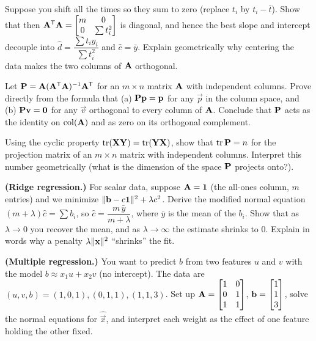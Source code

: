 \begin{exercise}\label{ch19:ex-centering}
Suppose you shift all the times so they sum to zero (replace $t_i$ by $t_i-\bar{t}$). Show that
then $\mathbf{A}^{\mathsf{T}}\mathbf{A}=\begin{bmatrix} m & 0\\ 0 & \sum t_i^2\end{bmatrix}$ is diagonal, and hence
the best slope and intercept decouple into $\hat{d}=\dfrac{\sum t_i y_i}{\sum t_i^2}$ and
$\hat{c}=\bar{y}$. Explain geometrically why centering the data makes the two columns of $\mathbf{A}$
orthogonal.
\end{exercise}

\begin{exercise}\label{ch19:ex-P-properties}
Let $\mathbf{P}=\mathbf{A}(\mathbf{A}^{\mathsf{T}}\mathbf{A})^{-1}\mathbf{A}^{\mathsf{T}}$ for an $m\times n$ matrix $\mathbf{A}$ with
independent columns. Prove directly from the formula that (a) $\mathbf{P}\mathbf{p}=\mathbf{p}$ for any
$\vec{p}$ in the column space, and (b) $\mathbf{P}\mathbf{v}=\mathbf{0}$ for any $\vec{v}$ orthogonal to
every column of $\mathbf{A}$. Conclude that $\mathbf{P}$ acts as the identity on $\operatorname{col}(\mathbf{A})$ and as
zero on its orthogonal complement.
\end{exercise}

\begin{exercise}\label{ch19:ex-trace-rank}
Using the cyclic property $\operatorname{tr}(\mathbf{X}\mathbf{Y})=\operatorname{tr}(\mathbf{Y}\mathbf{X})$, show that $\operatorname{tr}\mathbf{P}=n$ for
the projection matrix of an $m\times n$ matrix with independent columns. Interpret this number
geometrically (what is the dimension of the space $\mathbf{P}$ projects onto?).
\end{exercise}

\begin{exercise}\label{ch19:ex-ridge}
\textbf{(Ridge regression.)} For scalar data, suppose $\mathbf{A}=\mathbf{1}$ (the all-ones column,
$m$ entries) and we minimize $\lVert\mathbf{b}-c\mathbf{1}\rVert^2+\lambda c^2$. Derive the modified normal
equation $(m+\lambda)\hat{c}=\sum b_i$, so $\hat{c}=\dfrac{m\,\bar{y}}{m+\lambda}$, where $\bar{y}$ is
the mean of the $b_i$. Show that as
$\lambda\to 0$ you recover the mean, and as $\lambda\to\infty$ the estimate shrinks to $0$.
Explain in words why a penalty $\lambda\lVert\mathbf{x}\rVert^2$ ``shrinks'' the fit.
\end{exercise}

\begin{exercise}\label{ch19:ex-two-features}
\textbf{(Multiple regression.)} You want to predict $b$ from two features $u$ and $v$ with the
model $b\approx x_1 u + x_2 v$ (no intercept). The data are
$(u,v,b)=(1,0,1),(0,1,1),(1,1,3)$. Set up $\mathbf{A}=\begin{bmatrix}1&0\\0&1\\1&1\end{bmatrix}$,
$\mathbf{b}=\begin{bmatrix}1\\1\\3\end{bmatrix}$, solve the normal equations for $\hat{\vec{x}}$, and interpret each
weight as the effect of one feature holding the other fixed.
\end{exercise}

